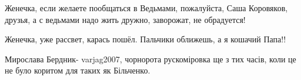 \begin{itemize}
 
Женечка, если желаете пообщаться в Ведьмами, пожалуйста, Саша Коровяков, друзья, а с ведьмами надо жить дружно, заворожат, не обрадуется!

 
Женечка, уже рассвет, карась пошёл. Пальчики оближешь, а я кошачий Папа!!

 
Мирослава Бердник- varjag2007, чорнорота рускоміровка ще з тих часів, коли це не було коритом для таких як Більченко.

\end{itemize}


